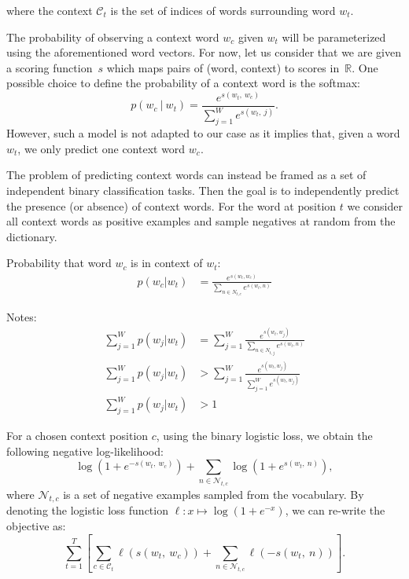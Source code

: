 where the context $\mathcal{C}_t$ is the set of indices of words surrounding word $w_t$.

The probability of observing a context word $w_c$ given $w_t$ will be parameterized using the aforementioned word vectors.
For now, let us consider that we are given a scoring function~$s$ which maps pairs of (word, context) to scores in~$\mathbb{R}$.
One possible choice to define the probability of a context word is the softmax:
\begin{equation*}
p(w_c \ | \ w_t) = \frac{e^{s(w_t,\ w_c)}}{\sum_{j=1}^W e^{s(w_t,\ j)}}.
\end{equation*}
However, such a model is not adapted to our case as it implies that, given a word $w_t$, we only predict one context word $w_c$.

The problem of predicting context words can instead be framed as a set of independent binary classification tasks.
Then the goal is to independently predict the presence (or absence) of context words.
For the word at position $t$ we consider all context words as positive examples and sample negatives at random from the dictionary.

Probability that word $w_c$ is in context of $w_t$:
\begin{align*}
  p(w_c | w_t) &= \frac{e^{s(w_t, w_c)}}{\sum_{n \in N_{t,c}} e^{s(w_t, n)}} 

\end{align*}

Notes:
\begin{align*}
  \sum_{j=1}^W p(w_j | w_t) &= \sum_{j=1}^W \frac{e^{s(w_t, w_j)}}{\sum_{n \in N_{t,j}} e^{s(w_t, n)}} \\
  \sum_{j=1}^W p(w_j | w_t) &> \sum_{j=1}^W \frac{e^{s(w_t, w_j)}}{\sum_{j=1}^W e^{s(w_t, w_j)}} \\
  \sum_{j=1}^W p(w_j | w_t) &> 1 
\end{align*}

For a chosen context position $c$, using the binary logistic loss, we obtain the following negative log-likelihood:
\begin{equation*}
  \log \left(1 + e^{-s(w_t,\ w_c)} \right) + \sum_{n \in \mathcal{N}_{t, c}} \log \left(1 + e^{s(w_t,\ n)}\right),
\end{equation*}
where $\mathcal{N}_{t,c}$ is a set of negative examples sampled from the vocabulary.
By denoting the logistic loss function $\ell: x \mapsto \log(1 + e^{-x})$, we can re-write the objective as:
\begin{equation*}
\sum_{t=1}^{T}  \left [ \sum_{c \in \mathcal{C}_t} \ell(s(w_t,\ w_c)) + \sum_{n \in \mathcal{N}_{t,c}} \ell(-s(w_t,\ n)) \right ].
\end{equation*}




